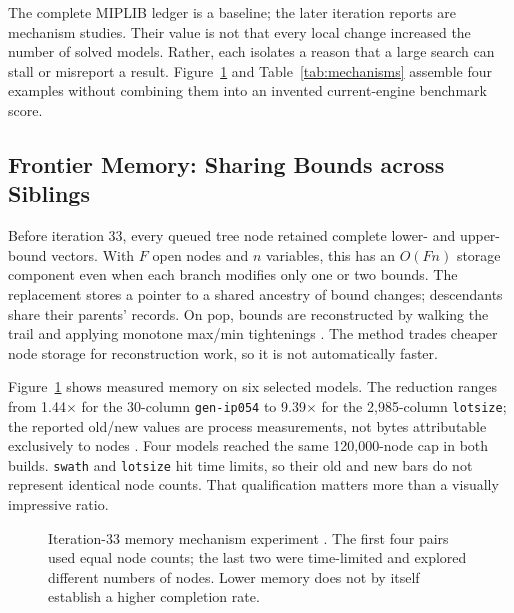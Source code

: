 \documentclass[10pt,a4paper,twocolumn]{article}
\begin{document}
The complete MIPLIB ledger is a baseline; the later iteration reports are mechanism studies. Their value is not that every local change increased the number of solved models. Rather, each isolates a reason that a large search can stall or misreport a result. Figure~\ref{fig:memory} and Table~\ref{tab:mechanisms} assemble four examples without combining them into an invented current-engine benchmark score.

\subsection{Frontier Memory: Sharing Bounds across Siblings}

Before iteration 33, every queued tree node retained complete lower- and upper-bound vectors. With $F$ open nodes and $n$ variables, this has an $O(Fn)$ storage component even when each branch modifies only one or two bounds. The replacement stores a pointer to a shared ancestry of bound changes; descendants share their parents' records. On pop, bounds are reconstructed by walking the trail and applying monotone max/min tightenings \cite{iter33}. The method trades cheaper node storage for reconstruction work, so it is not automatically faster.

Figure~\ref{fig:memory} shows measured memory on six selected models. The reduction ranges from 1.44$\times$ for the 30-column \texttt{gen-ip054} to 9.39$\times$ for the 2,985-column \texttt{lotsize}; the reported old/new values are process measurements, not bytes attributable exclusively to nodes \cite{iter33}. Four models reached the same 120,000-node cap in both builds. \texttt{swath} and \texttt{lotsize} hit time limits, so their old and new bars do not represent identical node counts. That qualification matters more than a visually impressive ratio.

\begin{figure}[t]
\centering
{}
\caption{Iteration-33 memory mechanism experiment \cite{iter33}. The first four pairs used equal node counts; the last two were time-limited and explored different numbers of nodes. Lower memory does not by itself establish a higher completion rate.}
\label{fig:memory}
\end{figure}
\end{document}
